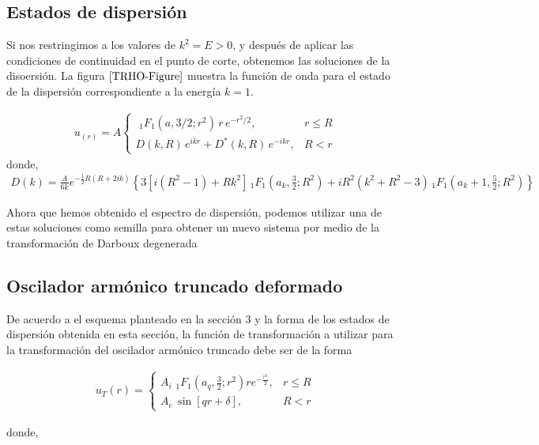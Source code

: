 \subsection{Estados de dispersión}

Si nos restringimos a los valores de $k^2 = E > 0$, y después de aplicar las condiciones de continuidad en el punto de corte, obtenemos las soluciones de la disoersión. La figura $\ref{TRHO-Figure}$ muestra la función de onda para el estado de la dispersión correspondiente a la energía $k = 1$.

\begin{eqnarray}
u_(r)=A\left\{
\begin{array}{cc}
\,\, _1F_1(a,3/2;r^2)\, r\, e^{-r^2/2}, & r\leq R  \\[0.2cm]
D(k,R)\, e^{ikr}+ D^{*}(k,R)\, e^{-ikr},&R<r   \label{TRHO-PsiS}
\end{array}
\right.
\end{eqnarray}
donde,
\small
\begin{eqnarray*}
	D(k) =
	\frac{A}{6k} e^{-\frac{1}{2}R(R+2ik)}\left\{3[i(R^{2}-1)+Rk^{2}]\, _1F_1\left(a_k ,\frac{3}{2};R^{2}\right)+iR^{2}(k^{2}+R^{2}-3)\, _1F_1\left(a_k+1,\frac{5}{2};R^{2}\right)\right\} 
\end{eqnarray*}

Ahora que hemos obtenido el espectro de dispersión, podemos utilizar una de estas soluciones como semilla para obtener un nuevo sistema por medio de la transformación de Darboux degenerada

\subsection{Oscilador armónico truncado deformado}

De acuerdo a el esquema planteado en la sección 3 y la forma de los estados de dispersión obtenida en esta sección, la función de transformación a utilizar para la transformación del oscilador armónico truncado debe ser de la forma

\begin{eqnarray}
u_T(r)=\left\{
\begin{array}{cc}
A_i \,\, _1F_1\left(a_{q},\frac{3}{2};r^{2}\right)re^{-\frac{r^{2}}{2}} , & r\leq R  \\[0.2cm]
A_e\,\sin{[qr+\delta]},&R<r   \label{DDT-TF}
\end{array}
\right.
\end{eqnarray}

donde,

